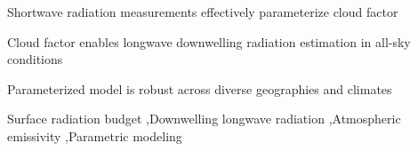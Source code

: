 \documentclass[preprint,12pt]{elsarticle}
\begin{document}
\begin{frontmatter}
\begin{abstract}
\end{abstract}


\begin{highlights}
\item Shortwave radiation measurements effectively parameterize cloud factor
\item Cloud factor enables longwave downwelling radiation estimation in all-sky conditions 
\item Parameterized model is robust across diverse geographies and climates
\end{highlights}

\begin{keyword}
Surface radiation budget \sep Downwelling longwave radiation \sep Atmospheric emissivity \sep Parametric modeling



\end{keyword}

\end{frontmatter}
\end{document}
